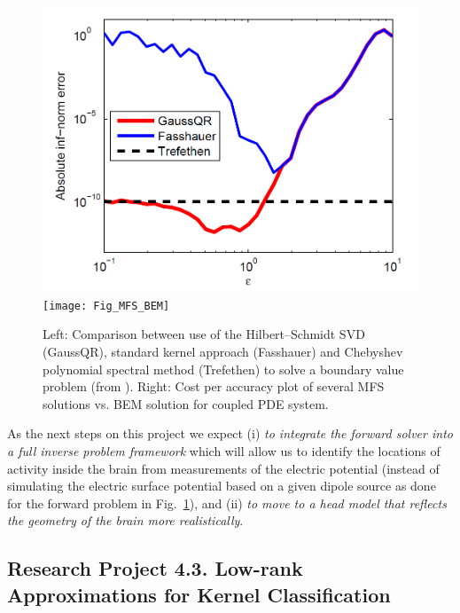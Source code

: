 \documentclass[11pt]{NSFamsart}
\begin{document}
\begin{figure}[h]
    \centering
    \includegraphics[width=.35\linewidth]{HSSVD_BVP}
    \texttt{[image: Fig\_MFS\_BEM]}
\caption{Left: Comparison between use of the Hilbert--Schmidt SVD (GaussQR), standard kernel approach (Fasshauer) and Chebyshev polynomial spectral method (Trefethen) to solve a boundary value problem (from \citep{McCourt13}). Right: Cost per accuracy plot of several MFS solutions vs. BEM solution for coupled PDE system.}\label{Fig_MFS_BEM}
\end{figure}

As the next steps on this project we expect (i) \emph{to integrate the forward solver into a full inverse problem framework} which will allow us to identify the locations of activity inside the brain from measurements of the electric potential (instead of simulating the electric surface potential based on a given dipole source as done for the forward problem in Fig.~\ref{Fig_MFS_BEM}), and (ii) \emph{to move to a head model that reflects the geometry of the brain more realistically}.

\subsection*{Research Project 4.3. Low-rank Approximations for Kernel Classification}\label{Sec_TruncHS}
\end{document}
